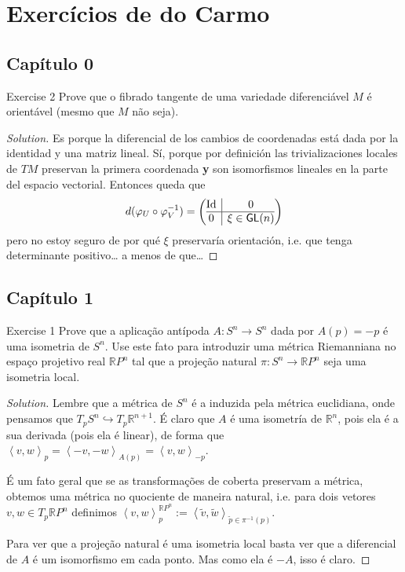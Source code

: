 \section{Exercícios de do Carmo}

\subsection{Capítulo 0}
\begin{thing4}{Exercise 2}\label{exer:2}\leavevmode
Prove que o fibrado tangente de uma variedade diferenciável \(M\) é orientável (mesmo que \(M\) não seja).
\end{thing4}

\begin{proof}[Solution]\leavevmode
Es porque la diferencial de los cambios de coordenadas está dada por la identidad y una matriz lineal. Sí, porque por definición las trivializaciones locales de \(TM\) preservan la primera coordenada \textbf{y} son isomorfismos lineales en la parte del espacio vectorial. Entonces queda que 
\[d(\varphi_U \circ \varphi_V^{-1})=\left(\begin{array}{@{}c|c@{}}
\operatorname{Id}&0\\
\hline
0&\xi \in \mathsf{GL}(n)\end{array}\right)\]
pero no estoy seguro de por qué \(\xi\) preservaría orientación, i.e. que tenga determinante positivo… a menos de que… 
\end{proof}

\subsection{Capítulo 1}

\begin{thing4}{Exercise 1}\label{exer:1}\leavevmode
Prove que a aplicação antípoda \(A:S^n \to S^n\) dada por \(A(p)=-p\) é uma isometria de \(S^n\). Use este fato para introduzir uma métrica Riemanniana no espaço projetivo real \(\mathbb{R}P^{n}\) tal que a projeção natural \(\pi: S^n \to \mathbb{R}P^{n}\) seja uma isometria local.
\end{thing4}
\begin{proof}[Solution]\leavevmode
	Lembre que a métrica de \(S^n\) é a induzida pela métrica euclidiana, onde pensamos que \(T_pS^n \hookrightarrow T_p\mathbb{R}^{n+1}\). É claro que \(A\) é uma isometría de \(\mathbb{R}^n\), pois ela é a sua derivada (pois ela é linear), de forma que \(\left<v,w\right>_p=\left<-v,-w\right>_{A(p)}=\left<v,w\right>_{-p}\).

	É um fato geral que se as transformações de coberta preservam a métrica, obtemos uma métrica no quociente de maneira natural, i.e. para dois vetores \(v,w\in T_p\mathbb{R}P^n\) definimos \(\left<v,w\right>_p^{\mathbb{R}P^n}:=\left<\tilde{v},\tilde{w}\right>_{\tilde{p} \in \pi^{-1}(p)}\).

Para ver que a projeção natural é uma isometria local basta ver que a diferencial de \(A\) é um isomorfismo em cada ponto. Mas como ela é \(-A\), isso é claro.
\end{proof}




